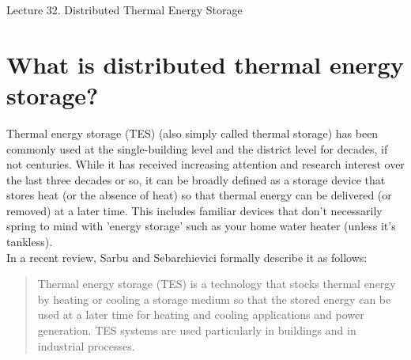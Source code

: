 \documentclass[10pt]{article}
\begin{document}
   \noindent
   \begin{center}

   \hrulefill
   
   \vspace{5pt}
   
   \vspace{0pt}
   
   {\Large \hfill  Lecture 32.  
Distributed Thermal Energy Storage
}
   \vspace{5pt}
   
  
   \hrulefill
   \end{center}

 {}




\section{What is distributed thermal energy storage?}

Thermal energy storage (TES) (also simply called thermal storage) has been commonly used at the single-building level and the district level for decades, if not centuries. While it has received increasing attention and research interest over the last three decades or so, it can be broadly defined as a storage device that stores heat (or the absence of heat) so that thermal energy can be delivered (or removed) at a later time. This includes familiar devices that don't necessarily spring to mind with 'energy storage' such as your home water heater (unless it's tankless).\\

In a recent review, Sarbu and Sebarchievici formally describe it as follows:

\begin{quote}
    Thermal energy storage (TES) is a technology that stocks thermal energy by heating or
cooling a storage medium so that the stored energy can be used at a later time for heating and cooling
applications and power generation. TES systems are used particularly in buildings and in industrial
processes. \cite{Sarbu2018-yg}
\end{quote}
\end{document}

